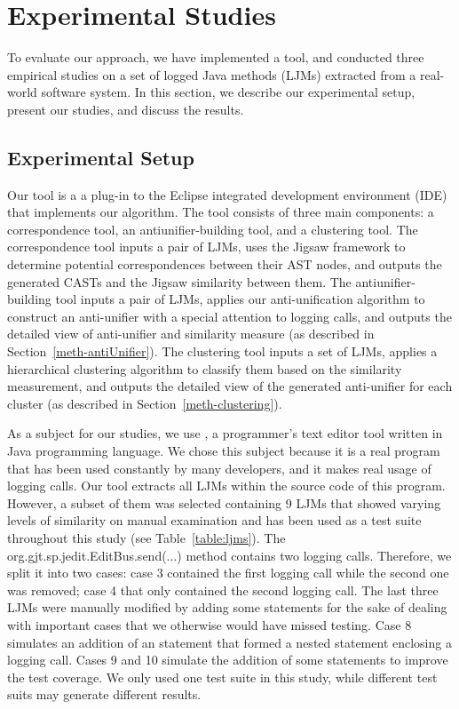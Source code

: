 
\chapter{Experimental Studies}  \label{studies}
To evaluate our approach, we have implemented a tool, and conducted three empirical studies on a set of logged Java methods (LJMs) extracted from a real-world software system. In this section, we describe our experimental setup, present our studies, and discuss the results. 

\section{Experimental Setup}  \label{experimental_setup}
Our tool is a a plug-in to the Eclipse integrated development environment (IDE) that implements our algorithm. The tool consists of three main components: a correspondence tool, an antiunifier-building tool, and a clustering tool. The correspondence tool inputs a pair of LJMs, uses the Jigsaw framework to determine potential correspondences between their AST nodes, and outputs the generated CASTs and the Jigsaw similarity between them. The antiunifier-building tool inputs a pair of LJMs, applies our anti-unification algorithm to construct an anti-unifier with a special attention to logging calls, and outputs the detailed view of anti-unifier and similarity measure (as described in Section~\ref{meth-antiUnifier}). The clustering tool inputs a set of LJMs, applies a hierarchical clustering algorithm to classify them based on the similarity measurement, and outputs the detailed view of the generated anti-unifier for each cluster (as described in Section~\ref{meth-clustering}). 

As a subject for our studies, we use , a programmer’s text editor tool written in Java programming language. We chose this subject because it is a real program that has been used constantly by many developers, and it makes real usage of logging calls.
Our tool extracts all LJMs within the source code of this program. However, a subset of them was selected containing 9 LJMs that showed varying levels of similarity on manual examination and has been used as a test suite throughout this study (see Table~\ref{table:ljms}). The org.gjt.sp.jedit.EditBus.send(...) method contains two logging calls. Therefore, we split it into two cases: case 3 contained the first logging call while the second one was removed; case 4 that only contained the second logging call. The last three LJMs were manually modified by adding some statements for the sake of dealing with important cases that we otherwise would have missed testing. Case 8 simulates an addition of an statement that formed a nested statement enclosing a logging call. Cases 9 and 10 simulate the addition of some statements to improve the test coverage.
We only used one test suite in this study, while different test suits may generate different results.


